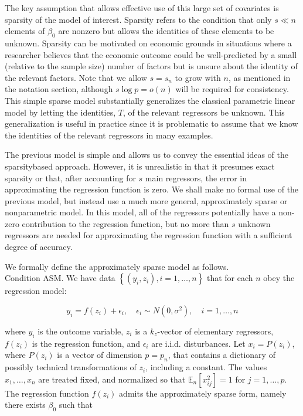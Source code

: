 \documentclass[10pt]{article}
\begin{document}
The key assumption that allows effective use of this large set of covariates is sparsity of the model of interest. Sparsity refers to the condition that only \(s \ll n\) elements of \(\beta_{0}\) are nonzero but allows the identities of these elements to be unknown. Sparsity can be motivated on economic grounds in situations where a researcher believes that the economic outcome could be well-predicted by a small (relative to the sample size) number of factors but is unsure about the identity of the relevant factors. Note that we allow \(s=s_{n}\) to grow with \(n\), as mentioned in the notation section, although \(s \log p=o(n)\) will be required for consistency. This simple sparse model substantially generalizes the classical parametric linear model by letting the identities, \(T\), of the relevant regressors be unknown. This generalization is useful in practice since it is problematic to assume that we know the identities of the relevant regressors in many examples.

The previous model is simple and allows us to convey the essential ideas of the sparsitybased approach. However, it is unrealistic in that it presumes exact sparsity or that, after accounting for \(s\) main regressors, the error in approximating the regression function is zero. We shall make no formal use of the previous model, but instead use a much more general, approximately sparse or nonparametric model. In this model, all of the regressors potentially have a non-zero contribution to the regression function, but no more than \(s\) unknown regressors are needed for approximating the regression function with a sufficient degree of accuracy.

We formally define the approximately sparse model as follows.\\
Condition ASM. We have data \(\left\{\left(y_{i}, z_{i}\right), i=1, \ldots, n\right\}\) that for each \(n\) obey the regression model:

\[
y_{i}=f\left(z_{i}\right)+\epsilon_{i}, \quad \epsilon_{i} \sim N\left(0, \sigma^{2}\right), \quad i=1, \ldots, n
\]

where \(y_{i}\) is the outcome variable, \(z_{i}\) is a \(k_{z}\)-vector of elementary regressors, \(f\left(z_{i}\right)\) is the regression function, and \(\epsilon_{i}\) are i.i.d. disturbances. Let \(x_{i}=P\left(z_{i}\right)\), where \(P\left(z_{i}\right)\) is a vector of dimension \(p=p_{n}\), that contains a dictionary of possibly technical transformations of \(z_{i}\), including a constant. The values \(x_{1}, \ldots, x_{n}\) are treated fixed, and normalized so that \(\mathbb{E}_{n}\left[x_{i j}^{2}\right]=1\) for \(j=1, \ldots, p\). The regression function \(f\left(z_{i}\right)\) admits the approximately sparse form, namely there exists \(\beta_{0}\) such that
\end{document}
